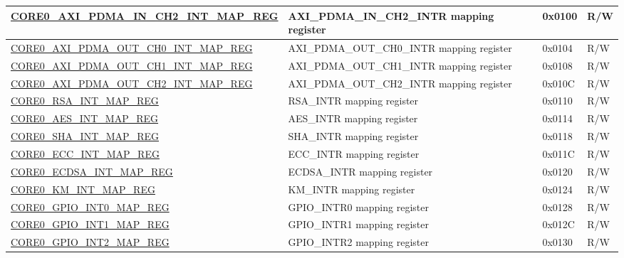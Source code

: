 \begin{longtable}{ | p{7.5cm} | p{7.2cm} | p{1.3cm} | p{1cm} | }
\hyperref[regdesc:CORE0AXIPDMAINCH2INTMAPREG]{CORE0\_AXI\_PDMA\_IN\_CH2\_INT\_MAP\_REG} & AXI\_PDMA\_IN\_CH2\_INTR mapping register & 0x0100 & R/W \\ \hline

\hyperref[regdesc:CORE0AXIPDMAOUTCH0INTMAPREG]{CORE0\_AXI\_PDMA\_OUT\_CH0\_INT\_MAP\_REG} & AXI\_PDMA\_OUT\_CH0\_INTR mapping register & 0x0104 & R/W \\ \hline

\hyperref[regdesc:CORE0AXIPDMAOUTCH1INTMAPREG]{CORE0\_AXI\_PDMA\_OUT\_CH1\_INT\_MAP\_REG} & AXI\_PDMA\_OUT\_CH1\_INTR mapping register & 0x0108 & R/W \\ \hline

\hyperref[regdesc:CORE0AXIPDMAOUTCH2INTMAPREG]{CORE0\_AXI\_PDMA\_OUT\_CH2\_INT\_MAP\_REG} & AXI\_PDMA\_OUT\_CH2\_INTR mapping register & 0x010C & R/W \\ \hline

\hyperref[regdesc:CORE0RSAINTMAPREG]{CORE0\_RSA\_INT\_MAP\_REG} & RSA\_INTR mapping register & 0x0110 & R/W \\ \hline

\hyperref[regdesc:CORE0AESINTMAPREG]{CORE0\_AES\_INT\_MAP\_REG} & AES\_INTR mapping register & 0x0114 & R/W \\ \hline

\hyperref[regdesc:CORE0SHAINTMAPREG]{CORE0\_SHA\_INT\_MAP\_REG} & SHA\_INTR mapping register & 0x0118 & R/W \\ \hline

\hyperref[regdesc:CORE0ECCINTMAPREG]{CORE0\_ECC\_INT\_MAP\_REG} & ECC\_INTR mapping register & 0x011C & R/W \\ \hline

\hyperref[regdesc:CORE0ECDSAINTMAPREG]{CORE0\_ECDSA\_INT\_MAP\_REG} & ECDSA\_INTR mapping register & 0x0120 & R/W \\ \hline

\hyperref[regdesc:CORE0KMINTMAPREG]{CORE0\_KM\_INT\_MAP\_REG} & KM\_INTR mapping register & 0x0124 & R/W \\ \hline

\hyperref[regdesc:CORE0GPIOINT0MAPREG]{CORE0\_GPIO\_INT0\_MAP\_REG} & GPIO\_INTR0 mapping register & 0x0128 & R/W \\ \hline

\hyperref[regdesc:CORE0GPIOINT1MAPREG]{CORE0\_GPIO\_INT1\_MAP\_REG} & GPIO\_INTR1 mapping register & 0x012C & R/W \\ \hline

\hyperref[regdesc:CORE0GPIOINT2MAPREG]{CORE0\_GPIO\_INT2\_MAP\_REG} & GPIO\_INTR2 mapping register & 0x0130 & R/W \\ \hline


\end{longtable}

